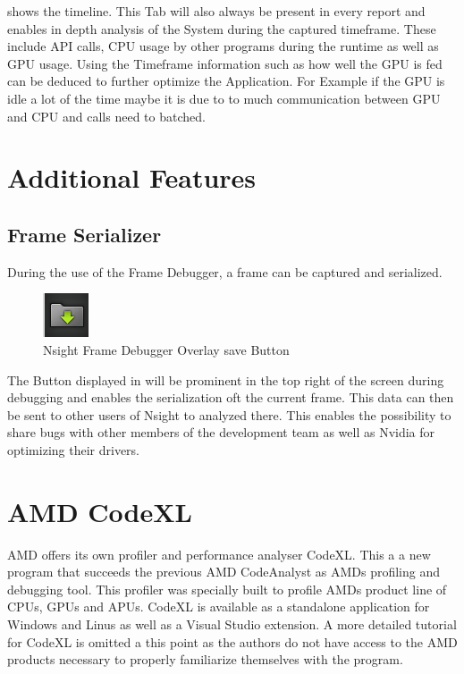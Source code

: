  shows the timeline. This Tab will also always be present in every report and enables in depth analysis of the System during the captured timeframe. These include API calls, CPU usage by other programs during the runtime as well as GPU usage. Using the Timeframe information such as how well the GPU is fed can be deduced to further optimize the Application. For Example if the GPU is idle a lot of the time maybe it is due to to much communication between GPU and CPU and calls need to batched.

\section{Additional Features}

\subsection{Frame Serializer}

During the use of the Frame Debugger, a frame can be captured and serialized. 
\begin{figure}[htbp]
\includegraphics[scale = 1]{img/NSight_Save.png}
\caption{Nsight Frame Debugger Overlay save Button}
\label{fig:Nsight_Save}
\end{figure}

The Button displayed in  will be prominent in the top right of the screen during debugging and enables the serialization oft the current frame. This data can then be sent to other users of Nsight to analyzed there. This enables the possibility to share bugs with other members of the development team as well as Nvidia for optimizing their drivers.

\section{AMD CodeXL}

AMD offers its own profiler and performance analyser CodeXL. This a a new program that succeeds the previous AMD CodeAnalyst as AMDs profiling and debugging tool. This profiler was specially built to profile AMDs product line of CPUs, GPUs and APUs. CodeXL is available as a standalone application for Windows and Linus as well as a Visual Studio extension. A more detailed tutorial for CodeXL is omitted a this point as the authors do not have access to the AMD products necessary to properly familiarize themselves with the program.
\citep{amd_codexl}


